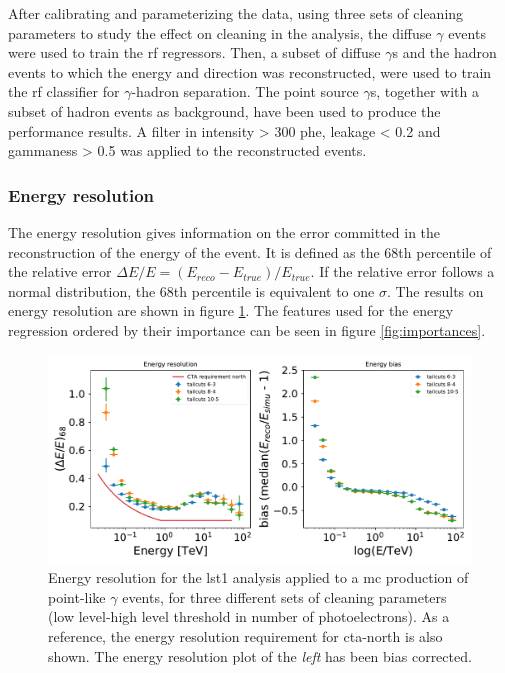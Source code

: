 \documentclass[main.tex]{subfiles}
\begin{document}
After calibrating and parameterizing the data, using three sets of cleaning parameters to study the effect on cleaning in the analysis, the diffuse $\gamma$ events were used to train the \gls{rf} regressors. Then, a subset of diffuse $\gamma$s and the hadron events to which the energy and direction was reconstructed, were used to train the \gls{rf} classifier for $\gamma$-hadron separation.
The point source $\gamma$s, together with a subset of hadron events as background, have been used to produce the performance results. A filter in intensity > 300 phe, leakage < 0.2 and gammaness > 0.5 was applied to the reconstructed events.  

\subsubsection{Energy resolution}

The energy resolution gives information on the error committed in the reconstruction of the energy of the event. It is defined as the 68th percentile of the relative error $\Delta E/E = (E_{reco}-E_{true})/E_{true}$. If the relative error follows a normal distribution, the 68th percentile is equivalent to one $\sigma$. The results on energy resolution are shown in figure \ref{fig:energy}. The features used for the energy regression ordered by their importance can be seen in figure \ref{fig:importances}.

\begin{figure}[h]
\centering
 \includegraphics[width=1\textwidth]{Pictures/energy_resolution.pdf}
  \caption{Energy resolution for the \gls{lst}1 analysis applied to a \gls{mc} production of point-like $\gamma$ events, for three different sets of cleaning parameters (low level-high level threshold in number of photoelectrons). As a reference, the energy resolution requirement for \gls{cta}-north is also shown. The energy resolution plot of the \textit{left} has been bias corrected.}
    \label{fig:energy}
\end{figure}
\end{document}
